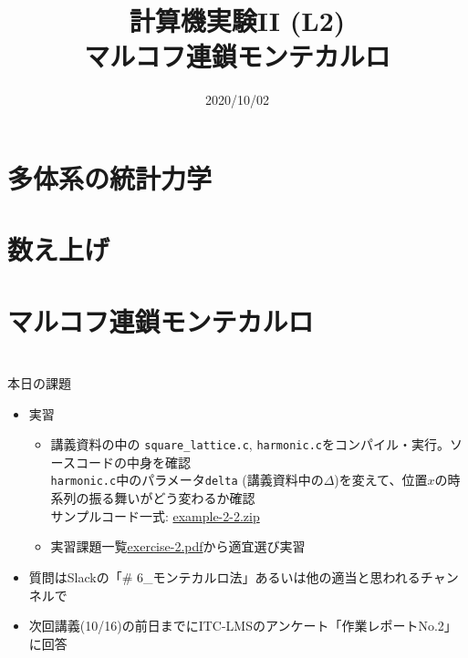 \documentclass[10pt,dvipdfmx]{beamer}
\title{計算機実験II (L2) \\ マルコフ連鎖モンテカルロ}
\date{2020/10/02}
\begin{document}
\begin{frame}
  \titlepage
  \tableofcontents
\end{frame}



\section{多体系の統計力学}






\section{数え上げ}




\section{マルコフ連鎖モンテカルロ}
















\section{}
\begin{frame}[t]{本日の課題}
  \begin{itemize}
  \item 実習
    \begin{itemize}
    \item 講義資料の中の {\tt square\_lattice.c}, {\tt harmonic.c}をコンパイル・実行。ソースコードの中身を確認 \\

      {\tt harmonic.c}中のパラメータ{\tt delta} (講義資料中の$\Delta$)を変えて、位置$x$の時系列の振る舞いがどう変わるか確認 \\
      
      サンプルコード一式: \href{https://github.com/todo-group/ComputerExperiments/releases/tag/2020a-computer2}{example-2-2.zip}
    \item 実習課題一覧\href{https://github.com/todo-group/ComputerExperiments/releases/tag/2020a-computer2}{exercise-2.pdf}から適宜選び実習
    \end{itemize}
  \item 質問はSlackの「\# 6\_モンテカルロ法」あるいは他の適当と思われるチャンネルで
  \item 次回講義(10/16)の前日までにITC-LMSのアンケート「作業レポートNo.2」に回答
  \end{itemize}
\end{frame}
\end{document}
